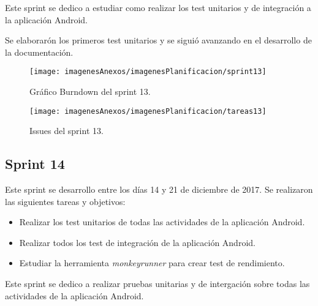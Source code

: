 Este sprint se dedico a estudiar como realizar los test unitarios y de integración a la aplicación Android.

Se elaborarón los primeros test unitarios y se siguió avanzando en el desarrollo de la documentación.

\begin{figure}[h]
    \begin{center}%
        \begin{center}%
          \texttt{[image: imagenesAnexos/imagenesPlanificacion/sprint13]}%
          \caption{Gráfico Burndown del sprint 13.}%
          \label{figSprint13}%
        \end{center}%
  	\end{center}%
\end{figure}%

\begin{figure}[h]
    \begin{center}%
        \begin{center}%
          \texttt{[image: imagenesAnexos/imagenesPlanificacion/tareas13]}%
          \caption{Issues del sprint 13.}%
          \label{figTareas13}%
        \end{center}%
  	\end{center}%
\end{figure}%

\newpage

\subsection{Sprint 14}

Este sprint se desarrollo entre los días 14 y 21 de diciembre de 2017. Se realizaron las siguientes tareas y objetivos:

\begin{itemize}
	\item Realizar los test unitarios de todas las actividades de la aplicación Android.
	\item Realizar todos los test de integración de la aplicación Android.
	\item Estudiar la herramienta \textit{monkeyrunner} para crear test de rendimiento.
\end{itemize}

Este sprint se dedico a realizar pruebas unitarias y de intergación sobre todas las actividades de la aplicación Android.

